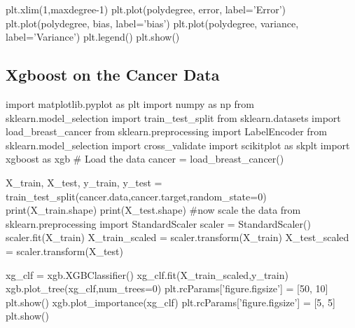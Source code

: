 \documentclass[%
oneside,                 %
final,                   %
10pt]{article}
\begin{document}
plt.xlim(1,maxdegree-1)
plt.plot(polydegree, error, label='Error')
plt.plot(polydegree, bias, label='bias')
plt.plot(polydegree, variance, label='Variance')
plt.legend()
plt.show()


\epycod



\subsection{Xgboost on the Cancer Data}
\bpycod
import matplotlib.pyplot as plt
import numpy as np
from sklearn.model_selection import  train_test_split 
from sklearn.datasets import load_breast_cancer
from sklearn.preprocessing import LabelEncoder
from sklearn.model_selection import cross_validate
import scikitplot as skplt
import xgboost as xgb
# Load the data
cancer = load_breast_cancer()

X_train, X_test, y_train, y_test = train_test_split(cancer.data,cancer.target,random_state=0)
print(X_train.shape)
print(X_test.shape)
#now scale the data
from sklearn.preprocessing import StandardScaler
scaler = StandardScaler()
scaler.fit(X_train)
X_train_scaled = scaler.transform(X_train)
X_test_scaled = scaler.transform(X_test)

xg_clf = xgb.XGBClassifier()
xg_clf.fit(X_train_scaled,y_train)
xgb.plot_tree(xg_clf,num_trees=0)
plt.rcParams['figure.figsize'] = [50, 10]
plt.show()
xgb.plot_importance(xg_clf)
plt.rcParams['figure.figsize'] = [5, 5]
plt.show()
\epycod


\end{document}
